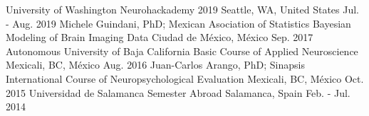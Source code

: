 \begin{cventries}
    \cventry
        {University of Washington}
        {Neurohackademy 2019}
        {Seattle, WA, United States}
        {Jul. - Aug. 2019}
        {}
    \cventry
        {Michele Guindani, PhD; Mexican Asociation of Statistics}
        {Bayesian Modeling of Brain Imaging Data}
        {Ciudad de México, México}
        {Sep. 2017}
        {}
    \cventry
        {Autonomous University of Baja California}
        {Basic Course of Applied Neuroscience}
        {Mexicali, BC, México}
        {Aug. 2016}
        {}
    \cventry
        {Juan-Carlos Arango, PhD; Sinapsis}
        {International Course of Neuropsychological Evaluation}
        {Mexicali, BC, México}
        {Oct. 2015}
        {}
    \cventry
        {Universidad de Salamanca}
        {Semester Abroad}
        {Salamanca, Spain}
        {Feb. - Jul. 2014}
        {}
\end{cventries}

